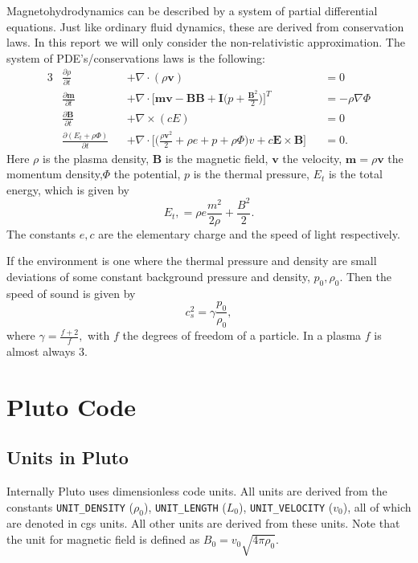 \documentclass[11pt]{article}
\begin{document}
Magnetohydrodynamics can be described by a system of partial differential equations. 
Just like ordinary fluid dynamics, these are derived from conservation laws. 
In this report we will only consider the non-relativistic approximation. 
The system of PDE's/conservations laws is the following:
\begin{alignat}{3}
    &\frac{\partial \rho}{\partial t} &&+ \nabla \cdot (\rho \mathbf v) &&= 0 \tag{mass}\label{masscont}\\
    &\frac{\partial \mathbf m}{\partial t} &&+  \nabla \cdot \bigg[\mathbf{mv - BB+ I}\bigg(p + \frac{\mathbf B^2}{2}\bigg)\bigg]^T &&= -\rho \nabla \Phi \tag{moment}\label{cauchymoment}\\
    &\frac{\partial \mathbf B}{\partial t} &&+ \nabla \times (cE) &&= 0 \tag{charge}\label{Faraday}\\
    &\frac{\partial(E_t + \rho \Phi)}{\partial t} &&+ \nabla \cdot \bigg[\bigg(\frac{\rho \mathbf v^2}{2} + \rho e + p + \rho \Phi\bigg)v + c \mathbf E \times \mathbf B\bigg] &&= 0 \tag{energy}\label{energy}.
\end{alignat}
Here $\rho$ is the plasma density, $\mathbf B$ is the magnetic field,  $\mathbf v$ the velocity, $\mathbf m= \rho \mathbf v$ the momentum density,$\Phi$ the potential, $p$ is the thermal pressure, $E_t$ is the total energy, which is given by \[
E_t, = \rho e \frac{m^2}{2\rho} + \frac{B^2}{2}
.\]  
The constants  $e, c$ are the elementary charge and the speed of light respectively.

If the environment is one where the thermal pressure and density are small deviations of some constant background pressure and density, $p_0, \rho_0$. Then the speed of sound is given by \[
c_s^2 = \gamma \frac{p_0}{\rho_0}
,\]
where $\gamma = \frac{f + 2}{f}, $ with $f$ the degrees of freedom of a particle. In a plasma $f$ is almost always $3$. 



\section{Pluto Code} \label{sec:pluto_code}

\subsection{Units in Pluto} \label{sec:units_in_pluto}

Internally Pluto uses dimensionless code units. All units are derived from the constants \texttt{UNIT\_DENSITY} ($\rho_0$), \texttt{UNIT\_LENGTH} ($L_0$), \texttt{UNIT\_VELOCITY} ($v_0$), all of which are denoted in cgs units. All other units are derived from these units.  
Note that the unit for magnetic field is defined as $B_0 = v_0\sqrt{4\pi \rho_0} $.
\end{document}
